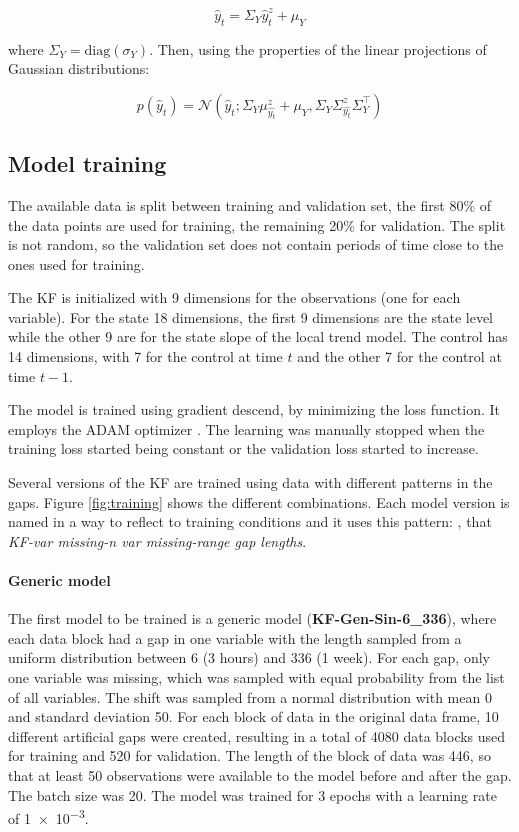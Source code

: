 \documentclass{article}
\newcommand{\norm}[3]{\mathcal{N}\left(#1; #2, #3\right)} %
\let\Oldsubsection\subsection
\renewcommand{\subsection}{\FloatBarrier\Oldsubsection}
\begin{document}
\begin{equation*}
    \hat{y}_t = \Sigma_Y\hat{y}^z_t + \mu_Y
\end{equation*}

where $\Sigma_Y = \text{diag}(\sigma_Y)$. Then, using the properties of the linear projections of Gaussian distributions:

\begin{equation*}
    p(\hat{y}_t) = \norm{\hat{y}_t}{\Sigma_Y\mu^z_{\hat{y_t}} + \mu_Y}{\Sigma_Y\Sigma^z_{\hat{y_t}}\Sigma_Y^\top}
\end{equation*}

\subsection{Model training}

The available data is split between training and validation set, the first 80\% of the data points are used for training, the remaining 20\% for validation. The split is not random, so the validation set does not contain periods of time close to the ones used for training.

The KF is initialized with 9 dimensions for the observations (one for each variable). For the state 18 dimensions, the first 9 dimensions are the state level while the other 9 are for the state slope of the local trend model. The control has 14 dimensions, with 7 for the control at time $t$ and the other 7 for the control at time $t-1$.

The model is trained using gradient descend, by minimizing the loss function. It employs the ADAM optimizer \cite{kingma_adam_2017}. The learning was manually stopped when the training loss started being constant or the validation loss started to increase.

Several versions of the KF are trained using data with different patterns in the gaps. Figure \ref{fig:training} shows the different combinations. Each model version is named in a way to reflect to training conditions and it uses this pattern: , that  \textit{KF-\textlangle var missing\textrangle-\textlangle n var missing\textrangle-\textlangle range gap lengths}.

\paragraph{Generic model} The first model to be trained is a generic model (\textbf{KF-Gen-Sin-6\_336}), where each data block had a gap in one variable with the length sampled from a uniform distribution between \num{6} (3 hours) and \num{336} (1 week). For each gap, only one variable was missing, which was sampled with equal probability from the list of all variables. The shift was sampled from a normal distribution with mean 0 and standard deviation 50. For each block of data in the original data frame, 10 different artificial gaps were created, resulting in a total of 4080 data blocks used for training and 520 for validation. 
The length of the block of data was \num{446}, so that at least \num{50} observations were available to the model before and after the gap. The batch size was \num{20}. 
The model was trained for \num{3} epochs with a learning rate of \num{1e-3}.
\end{document}
